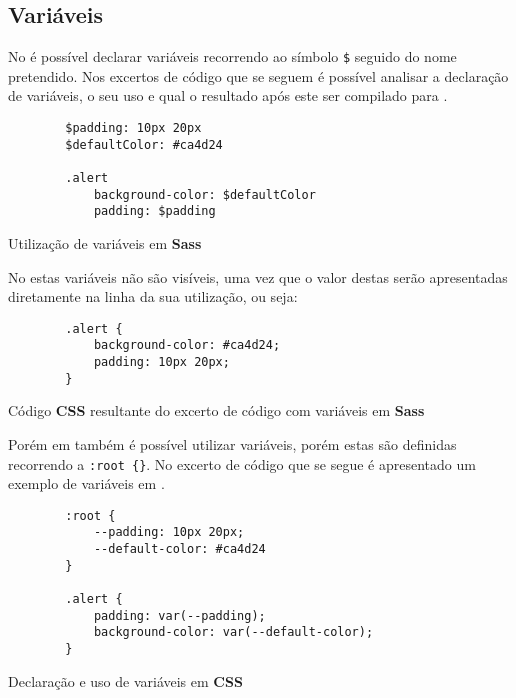 \subsection{Variáveis}

No \textbf{} é possível declarar variáveis recorrendo ao símbolo \verb|$| seguido do nome pretendido. Nos excertos de código que se seguem é possível analisar a declaração de variáveis, o seu uso e qual o resultado após este ser compilado para \textbf{}.

\begin{longlisting}
	\begin{verbatim}
		$padding: 10px 20px
		$defaultColor: #ca4d24

		.alert
			background-color: $defaultColor
			padding: $padding
	\end{verbatim}
	\caption{Utilização de variáveis em \textbf{Sass}}
\end{longlisting}

No \textbf{} estas variáveis não são visíveis, uma vez que o valor destas serão apresentadas diretamente na linha da sua utilização, ou seja:

\begin{longlisting}
	\begin{verbatim}
		.alert {
			background-color: #ca4d24;
			padding: 10px 20px;
		}
	\end{verbatim}
	\caption{Código \textbf{CSS} resultante do excerto de código com variáveis em \textbf{Sass}}
\end{longlisting}

Porém em \textbf{} também é possível utilizar variáveis, porém estas são definidas recorrendo a \verb|:root {}|. No excerto de código que se segue é apresentado um exemplo de variáveis em \textbf{}.

\begin{longlisting}
	\begin{verbatim}
		:root {
			--padding: 10px 20px;
			--default-color: #ca4d24
		}

		.alert {
			padding: var(--padding);
			background-color: var(--default-color);
		}
	\end{verbatim}
	\caption{Declaração e uso de variáveis em \textbf{CSS}}
\end{longlisting}
